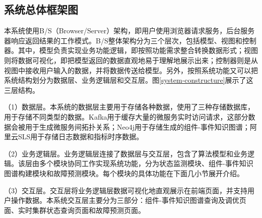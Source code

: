 \subsection{系统总体框架图}
本系统使用B/S（Browser/Server）架构，即用户使用浏览器请求服务，后台服务器响应返回结果的工作模式。B/S整体架构分为三个层次，包括模型、视图和控制器。其中，模型负责实现业务功能逻辑，即按照功能需求整合转换数据形式；视图则将数据可视化，即把模型返回的数据直观地易于理解地展示出来；控制器则是从视图中接收用户输入的数据，并将数据传送给模型。另外，按照系统功能又可以把系统结构划分为数据层、业务逻辑层和交互层。图\ref{system-constructure}展示了这三层结构。

（1）数据层。本系统的数据层主要用于存储各种数据，使用了三种存储数据库，用于存储不同类型的数据。Kafka用于缓存大量的微服务实时访问请求，这部分数据会被用于生成微服务间拓扑关系；Neo4j用于存储生成的组件-事件知识图谱；阿里云SLS用于存储日志数据和指标时序数据。

（2）业务逻辑层。业务逻辑层连接了数据层与交互层，包含了算法模型和业务逻辑。该层由多个模块协同工作实现系统功能，分为状态监测模块、组件-事件知识图谱构建模块和故障预测模块。每个模块的具体功能在下面几小节展开介绍。

（3）交互层。交互层将业务逻辑层数据可视化地直观展示在前端页面，并支持用户操作数据。本系统交互层主要分为三部分：组件-事件知识图谱查询及调优页面、实时集群状态查询页面和故障预测页面。

